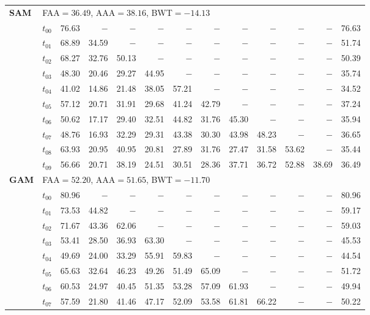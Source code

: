 \begin{table}[ht]
\begin{tabular}{@{}l l r r r r r r r r r r r@{}}
\multirow{11}{*}{\textbf{SAM}} & \multicolumn{12}{l}{\quad\small FAA$=36.49$,\; AAA$=38.16$,\; BWT$=-14.13$} \\
 & $t_{00}$ & 76.63 & $-$ & $-$ & $-$ & $-$ & $-$ & $-$ & $-$ & $-$ & $-$ & 76.63 \\
 & $t_{01}$ & 68.89 & 34.59 & $-$ & $-$ & $-$ & $-$ & $-$ & $-$ & $-$ & $-$ & 51.74 \\
 & $t_{02}$ & 68.27 & 32.76 & 50.13 & $-$ & $-$ & $-$ & $-$ & $-$ & $-$ & $-$ & 50.39 \\
 & $t_{03}$ & 48.30 & 20.46 & 29.27 & 44.95 & $-$ & $-$ & $-$ & $-$ & $-$ & $-$ & 35.74 \\
 & $t_{04}$ & 41.02 & 14.86 & 21.48 & 38.05 & 57.21 & $-$ & $-$ & $-$ & $-$ & $-$ & 34.52 \\
 & $t_{05}$ & 57.12 & 20.71 & 31.91 & 29.68 & 41.24 & 42.79 & $-$ & $-$ & $-$ & $-$ & 37.24 \\
 & $t_{06}$ & 50.62 & 17.17 & 29.40 & 32.51 & 44.82 & 31.76 & 45.30 & $-$ & $-$ & $-$ & 35.94 \\
 & $t_{07}$ & 48.76 & 16.93 & 32.29 & 29.31 & 43.38 & 30.30 & 43.98 & 48.23 & $-$ & $-$ & 36.65 \\
 & $t_{08}$ & 63.93 & 20.95 & 40.95 & 20.81 & 27.89 & 31.76 & 27.47 & 31.58 & 53.62 & $-$ & 35.44 \\
 & $t_{09}$ & 56.66 & 20.71 & 38.19 & 24.51 & 30.51 & 28.36 & 37.71 & 36.72 & 52.88 & 38.69 & 36.49 \\
\midrule
\multirow{11}{*}{\textbf{GAM}} & \multicolumn{12}{l}{\quad\small FAA$=52.20$,\; AAA$=51.65$,\; BWT$=-11.70$} \\
 & $t_{00}$ & 80.96 & $-$ & $-$ & $-$ & $-$ & $-$ & $-$ & $-$ & $-$ & $-$ & 80.96 \\
 & $t_{01}$ & 73.53 & 44.82 & $-$ & $-$ & $-$ & $-$ & $-$ & $-$ & $-$ & $-$ & 59.17 \\
 & $t_{02}$ & 71.67 & 43.36 & 62.06 & $-$ & $-$ & $-$ & $-$ & $-$ & $-$ & $-$ & 59.03 \\
 & $t_{03}$ & 53.41 & 28.50 & 36.93 & 63.30 & $-$ & $-$ & $-$ & $-$ & $-$ & $-$ & 45.53 \\
 & $t_{04}$ & 49.69 & 24.00 & 33.29 & 55.91 & 59.83 & $-$ & $-$ & $-$ & $-$ & $-$ & 44.54 \\
 & $t_{05}$ & 65.63 & 32.64 & 46.23 & 49.26 & 51.49 & 65.09 & $-$ & $-$ & $-$ & $-$ & 51.72 \\
 & $t_{06}$ & 60.53 & 24.97 & 40.45 & 51.35 & 53.28 & 57.09 & 61.93 & $-$ & $-$ & $-$ & 49.94 \\
 & $t_{07}$ & 57.59 & 21.80 & 41.46 & 47.17 & 52.09 & 53.58 & 61.81 & 66.22 & $-$ & $-$ & 50.22 \\

\end{tabular}
\end{table}
